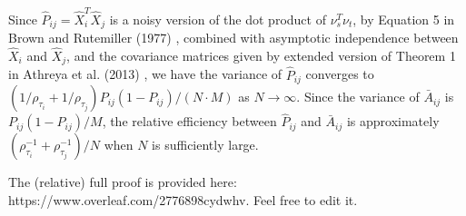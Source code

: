 \documentclass[a4paper]{article}
\begin{document}
Since $\hat{P}_{ij} = \hat{X}_i^T \hat{X}_j$ is a noisy version of the dot product of $\nu_s^T \nu_t$, by Equation 5 in Brown and Rutemiller (1977) \cite{brown1977means}, combined with asymptotic independence between $\hat{X}_i$ and $\hat{X}_j$, and the covariance matrices given by extended version of Theorem 1 in Athreya et al. (2013) \cite{athreya2013limit}, we have the variance of $\hat{P}_{ij}$ converges to $\left( 1/\rho_{\tau_i} + 1/\rho_{\tau_j} \right) P_{ij} (1-P_{ij})/(N \cdot M)$ as $N \rightarrow \infty$. Since the variance of $\bar{A}_{ij}$ is $P_{ij} (1-P_{ij})/M$, the relative efficiency between $\hat{P}_{ij}$ and $\bar{A}_{ij}$ is approximately $(\rho_{\tau_i}^{-1} + \rho_{\tau_j}^{-1})/N$ when $N$ is sufficiently large.
	
The (relative) full proof is provided here: \\
https://www.overleaf.com/2776898cydwhv. Feel free to edit it.

{}

\end{document}
